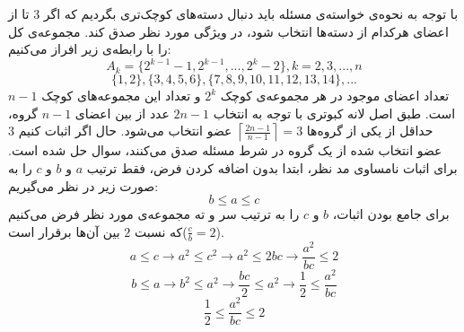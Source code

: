\p
با توجه به نحوه‌ی خواسته‌ی مسئله باید دنبال دسته‌های کوچک‌تری بگردیم که اگر 3 تا از اعضای هرکدام از دسته‌ها انتخاب شود، در ویژگی مورد نظر صدق کند. مجموعه‌ی کل را با رابطه‌ی زیر افراز می‌کنیم:
    \[A_k = \{2^{k-1}-1,2^{k-1},...,2^{k}-2\} , k=2,3,...,n\]
    \[\{1,2\}, \{3,4,5,6\}, \{7,8,9,10,11,12,13,14\}, ...\]
    تعداد اعضای موجود در هر مجموعه‌ی کوچک \(2^k\) و تعداد این مجموعه‌های کوچک
     $n-1$
     است. طبق اصل لانه کبوتری با توجه به انتخاب
     $2n-1$
     عدد از بین اعضای
      $n-1$ 
     گروه، حداقل از یکی از گروه‌ها 
     $\left \lceil \frac{2n-1}{n-1} \right \rceil = 3$
      عضو انتخاب می‌شود. حال اگر اثبات کنیم
      $3$ 
     عضو انتخاب شده از یک گروه در شرط مسئله صدق می‌کنند، سوال حل شده است.
     \p
    برای اثبات نامساوی مد نظر، ابتدا بدون اضافه کردن فرض، فقط ترتیب 
    $a$
    و
    $b$
    و
    $c$
    را به صورت زیر در نظر می‌گیریم:
     $$b\leq a\leq c$$
     برای جامع بودن اثبات، 
    $b$
    و
    $c$
     را به ترتیب سر و ته مجموعه‌ی مورد نظر فرض می‌کنیم که نسبت
      $2$ 
    بین آن‌ها برقرار است($\frac{c}{b} = 2$).
    \[a\leq c \to a^2\leq c^2 \to a^2\leq 2bc \to \frac{a^2}{bc}\leq 2\]
    \[b\leq a \to b^2\leq a^2 \to \frac{bc}{2}\leq a^2 \to \frac{1}{2}\leq\frac{a^2}{bc}\]
    \[\frac{1}{2}\leq\frac{a^2}{bc}\leq2\]